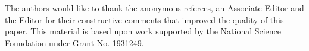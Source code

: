 \documentclass[aoas]{imsart}
\theoremstyle{plain}
\theoremstyle{remark}
\begin{document}
\begin{acks}[Acknowledgments]
The authors would like to thank the anonymous referees, an Associate
Editor and the Editor for their constructive comments that improved the
quality of this paper. This material is based upon work supported by the National Science Foundation under Grant No. 1931249.
\end{acks}

%



\end{document}
